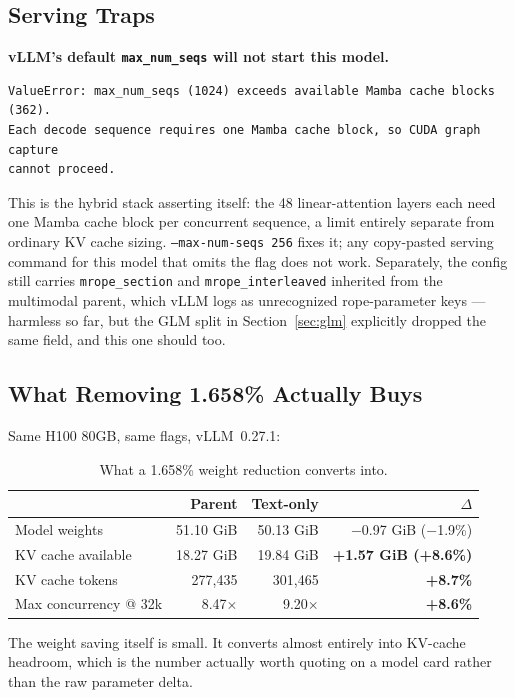 \documentclass[11pt]{article}
\begin{document}
\subsection{Serving Traps}

\textbf{vLLM's default \texttt{max\_num\_seqs} will not start this model.}

\begin{lstlisting}
ValueError: max_num_seqs (1024) exceeds available Mamba cache blocks (362).
Each decode sequence requires one Mamba cache block, so CUDA graph capture
cannot proceed.
\end{lstlisting}

This is the hybrid stack asserting itself: the 48 linear-attention layers each need one
Mamba cache block per concurrent sequence, a limit entirely separate from ordinary KV
cache sizing. \texttt{--max-num-seqs 256} fixes it; any copy-pasted serving command for
this model that omits the flag does not work. Separately, the config still carries
\texttt{mrope\_section} and \texttt{mrope\_interleaved} inherited from the multimodal
parent, which vLLM logs as unrecognized rope-parameter keys --- harmless so far, but the
GLM split in Section~\ref{sec:glm} explicitly dropped the same field, and this one
should too.

\subsection{What Removing 1.658\% Actually Buys}

Same H100 80GB, same flags, vLLM~0.27.1:

\begin{table}[h]
\centering
\small
\begin{tabular}{lrrr}
\toprule
 & Parent & Text-only & $\Delta$ \\
\midrule
Model weights & 51.10 GiB & 50.13 GiB & $-$0.97 GiB ($-$1.9\%) \\
KV cache available & 18.27 GiB & 19.84 GiB & \textbf{+1.57 GiB (+8.6\%)} \\
KV cache tokens & 277,435 & 301,465 & \textbf{+8.7\%} \\
Max concurrency @ 32k & 8.47$\times$ & 9.20$\times$ & \textbf{+8.6\%} \\
\bottomrule
\end{tabular}
\caption{What a 1.658\% weight reduction converts into.}
\end{table}

The weight saving itself is small. It converts almost entirely into KV-cache headroom,
which is the number actually worth quoting on a model card rather than the raw
parameter delta.
\end{document}
